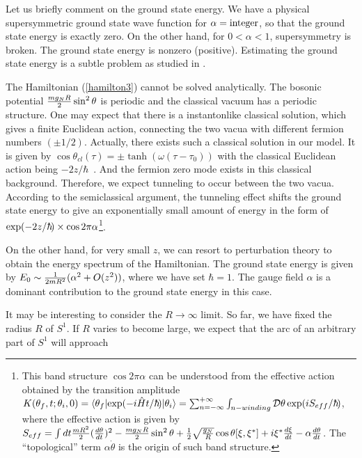 \documentclass[a4paper,12pt]{article}
\begin{document}
Let us briefly comment on the ground state energy. We have a physical
supersymmetric ground state wave function for $\alpha={\rm integer}$, so that 
the ground state energy is exactly zero. 
On the other hand, for $0< \alpha < 1$, supersymmetry 
is broken. The ground state energy is nonzero (positive).
Estimating the ground state energy is a subtle 
problem as studied in \cite{abbott1}\cite{abbott2}. 
\par
The Hamiltonian (\ref{hamilton3}) cannot be solved 
analytically. The bosonic potential ${{mg_N R}\over 2}\sin^2\theta$
is periodic and the classical vacuum has a periodic structure. One may expect 
that there is a instantonlike classical solution, which gives a finite 
Euclidean action, connecting the two vacua with different 
fermion numbers $(\pm 1/2)$. Actually, there exists such a classical 
solution in our model. It is given by 
$
\cos\theta_{cl}(\tau)=\pm \tanh(\omega(\tau-\tau_0))
$
with the classical Euclidean action being $-2z/\hbar$~. And the fermion zero 
mode exists in this classical background. Therefore, we expect 
tunneling to occur between the two vacua. According to the semiclassical 
argument, the tunneling effect shifts the ground state energy to give 
an exponentially small amount of energy in the form of
${\rm exp}(-2z/\hbar)\times \cos{2\pi\alpha}$\footnote{This band structure
$\cos{2\pi\alpha}$ can be understood from the effective action 
obtained by the transition amplitude $K(\theta_f,t;\theta_i,0)
=\bra{\theta_f}{\exp(-i{\hat H}t/\hbar)\ket{\theta_i}}=
\sum_{n=-\infty}^{+\infty}\int_{n-winding} {\cal D}\theta 
\exp(iS_{eff}/\hbar)$, where the effective action is given by 
$S_{eff}=\int dt {{mR^2}\over 2}({{d\theta}\over {dt}})^2
-{{mg_NR}\over 2}\sin^2\theta
+{1\over2}\sqrt{g_N\over R}\cos\theta[\xi, \xi^*]+i\xi^*{{d\xi}\over {dt}}
-\alpha{d\theta\over {dt}}$. The ``topological'' term 
$\alpha{\dot\theta}$ is the origin of such band structure\cite{raja}.}. 
\par
On the other hand, for very small $z$, we
can resort to perturbation theory to obtain the energy spectrum of
the Hamiltonian. The ground state energy is given by 
$E_0\sim {1\over {2mR^2}}(\alpha^2+O(z^2))$, where we have set $\hbar=1$. 
The gauge field $\alpha$ is a dominant contribution to the ground state
energy in this case.    
\par
It may be interesting to consider the $R\rightarrow \infty$ limit.
So far, we have fixed the radius $R$ of $S^1$. If $R$ varies to become 
large, we expect that the arc of an arbitrary part of $S^1$ will approach 
\end{document}
